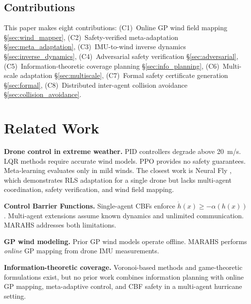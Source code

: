 \documentclass[11pt,twocolumn]{article}
\theoremstyle{definition}
\begin{document}
\subsection{Contributions}
This paper makes eight contributions: (C1)~Online GP wind field mapping \S\ref{sec:wind_mapper}, (C2)~Safety-verified meta-adaptation \S\ref{sec:meta_adaptation}, (C3)~IMU-to-wind inverse dynamics \S\ref{sec:inverse_dynamics}, (C4)~Adversarial safety verification \S\ref{sec:adversarial}, (C5)~Information-theoretic coverage planning \S\ref{sec:info_planning}, (C6)~Multi-scale adaptation \S\ref{sec:multiscale}, (C7)~Formal safety certificate generation \S\ref{sec:formal}, (C8)~Distributed inter-agent collision avoidance \S\ref{sec:collision_avoidance}.

\section{Related Work}
\label{sec:related_work}

\textbf{Drone control in extreme weather.} PID controllers \citep{Duggal2020} degrade above 20~m/s. LQR methods \citep{Abichandani2019} require accurate wind models. PPO \citep{PPO2017} provides no safety guarantees. Meta-learning \citep{Peng2021} evaluates only in mild winds. The closest work is Neural Fly \citep{NeuralFly2022}, which demonstrates RLS adaptation for a single drone but lacks multi-agent coordination, safety verification, and wind field mapping.

\textbf{Control Barrier Functions.} Single-agent CBFs \citep{Ames2014,Ames2019} enforce $\dot{h}(x) \geq -\alpha(h(x))$. Multi-agent extensions \citep{Wang2018,Glotfelter2017} assume known dynamics and unlimited communication. MARAHS addresses both limitations.

\textbf{GP wind modeling.} Prior GP wind models \citep{Srinivas2010,Krause2008} operate offline. MARAHS performs \emph{online} GP mapping from drone IMU measurements.

\textbf{Information-theoretic coverage.} Voronoi-based methods \citep{Cortes2004} and game-theoretic formulations \citep{Schwager2011} exist, but no prior work combines information planning with online GP mapping, meta-adaptive control, and CBF safety in a multi-agent hurricane setting.

\end{document}
